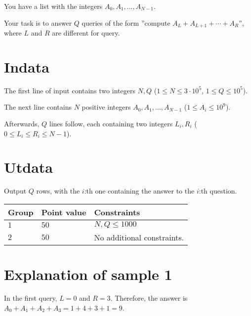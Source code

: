 You have a list with the integers $A_0, A_1, \dots, A_{N-1}$.

Your task is to answer $Q$ queries of the form ”compute $A_L+A_{L+1}+\cdots+A_{R}$”, where $L$ and $R$
are different for query.

\section*{Indata}
The first line of input contains two integers $N, Q$ ($1 \leq N \leq 3 \cdot 10^5$, $1 \leq Q \leq 10^5$).

The next line contains $N$ positive integers $A_0, A_1, \dots, A_{N-1}$ ($1 \leq A_i \leq 10^9$).

Afterwards, $Q$ lines follow, each containing two integers $L_{i},R_{i}$ ($0 \leq L_{i} \leq R_{i} \leq N-1$).

\section*{Utdata}
Output $Q$ rows, with the $i$:th one containing the answer to the $i$:th question.

\noindent
\begin{tabular}{| l | l | p{12cm} |}
  \hline
  \textbf{Group} & \textbf{Point value} & \textbf{Constraints} \\ \hline
  $1$    & $50$      &  $N,Q \leq 1000$ \\ \hline
  $2$    & $50$      & No additional constraints. \\ \hline
\end{tabular}

\section*{Explanation of sample 1}
In the first query, $L=0$ and $R=3$. Therefore, the answer is $A_0+A_1+A_2+A_3=1+4+3+1=9$.
